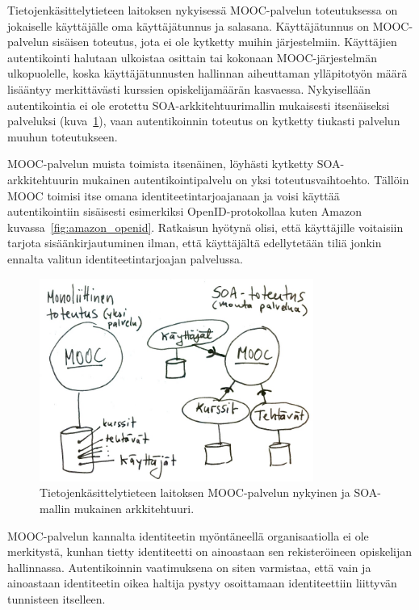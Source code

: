 \documentclass[finnish,gradu]{tktltiki}
\begin{document}
  Tietojenkäsittelytieteen laitoksen nykyisessä MOOC-palvelun toteutuksessa on jokaiselle käyttäjälle oma käyttäjätunnus ja salasana. Käyttäjätunnus on MOOC-palvelun sisäisen toteutus, jota ei ole kytketty muihin järjestelmiin. Käyttäjien autentikointi halutaan ulkoistaa osittain tai kokonaan MOOC-järjestelmän ulkopuolelle, koska käyttäjätunnusten hallinnan aiheuttaman ylläpitotyön määrä lisääntyy merkittävästi kurssien opiskelijamäärän kasvaessa. Nykyisellään autentikointia ei ole erotettu SOA-arkkitehtuurimallin mukaisesti itsenäiseksi palveluksi (kuva~\ref{fig:mooc-arkkitehtuuri}), vaan autentikoinnin toteutus on kytketty tiukasti palvelun muuhun toteutukseen.

  MOOC-palvelun muista toimista itsenäinen, löyhästi kytketty SOA-arkkitehtuurin mukainen autentikointipalvelu on yksi toteutusvaihtoehto. Tällöin MOOC toimisi itse omana identiteetintarjoajanaan ja voisi käyttää autentikointiin sisäisesti esimerkiksi OpenID-protokollaa kuten Amazon kuvassa~\ref{fig:amazon_openid}. Ratkaisun hyötynä olisi, että käyttäjille voitaisiin tarjota sisäänkirjautuminen ilman, että käyttäjältä edellytetään tiliä jonkin ennalta valitun identiteetintarjoajan palvelussa.


  \begin{figure}[h!]
    \centering
    \includegraphics[width=0.8\textwidth]{images/mooc-arkkitehtuuri.jpg}
    \caption[MOOC-palvelun nykyinen ja SOA-mallin mukainen arkkitehtuuri.]{Tietojenkäsittelytieteen laitoksen MOOC-palvelun nykyinen ja SOA-mallin mukainen arkkitehtuuri.}
    \label{fig:mooc-arkkitehtuuri}
  \end{figure}

   MOOC-palvelun kannalta identiteetin myöntäneellä organisaatiolla ei ole merkitystä, kunhan tietty identiteetti on ainoastaan sen rekisteröineen opiskelijan hallinnassa. Autentikoinnin vaatimuksena on siten varmistaa, että vain ja ainoastaan identiteetin oikea haltija pystyy osoittamaan identiteettiin liittyvän tunnisteen itselleen.
\end{document}
